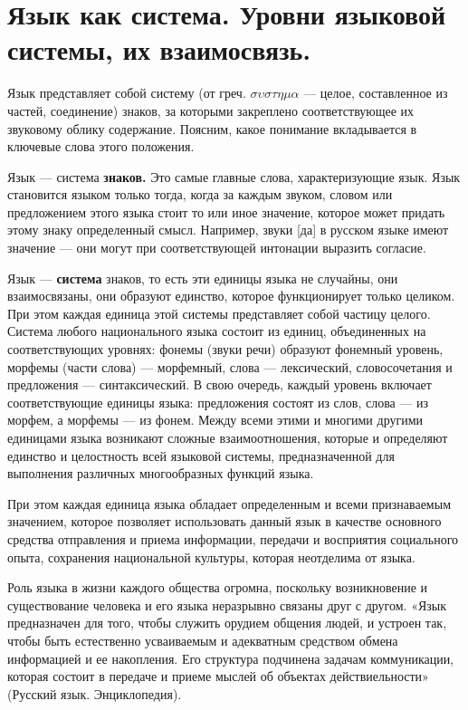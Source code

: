 \section{Язык как система. Уровни языковой системы, их взаимосвязь.}

Язык представляет собой систему (от греч. $\sigma \upsilon \sigma \tau \eta \mu \alpha$ --- целое, составленное из частей, соединение) знаков, за которыми закреплено соответствующее их звуковому облику содержание.
Поясним, какое понимание вкладывается в ключевые слова этого положения.

Язык --- система \textbf{знаков.}
Это самые главные слова, характеризующие язык.
Язык становится языком только тогда, когда за каждым звуком, словом или предложением этого языка стоит то или иное значение, которое может придать этому знаку определенный смысл.
Например, звуки [да] в русском языке имеют значение --- они могут при соответствующей интонации выразить согласие.

Язык --- \textbf{система} знаков, то есть эти единицы языка не случайны, они взаимосвязаны, они образуют единство, которое функционирует только целиком.
При этом каждая единица этой системы представляет собой частицу целого.
Система любого национального языка состоит из единиц, объединенных на соответствующих уровнях: фонемы (звуки речи) образуют фонемный уровень, морфемы (части слова) --- морфемный, слова --- лексический, словосочетания и предложения --- синтаксический.
В свою очередь, каждый уровень включает соответствующие единицы языка: предложения состоят из слов, слова --- из морфем, а морфемы --- из фонем.
Между всеми этими и многими другими единицами языка возникают сложные взаимоотношения, которые и определяют единство и целостность всей языковой системы, предназначенной для выполнения различных многообразных функций языка.

При этом каждая единица языка обладает определенным и всеми признаваемым значением, которое позволяет использовать данный язык в качестве основного средства отправления и приема информации, передачи и восприятия социального опыта, сохранения национальной культуры, которая неотделима от языка.

Роль языка в жизни каждого общества огромна, поскольку возникновение и существование человека и его языка неразрывно связаны друг с другом.
«Язык предназначен для того, чтобы служить орудием общения людей, и устроен так, чтобы быть естественно усваиваемым и адекватным средством обмена информацией и ее накопления.
Его структура подчинена задачам коммуникации, которая состоит в передаче и приеме мыслей об объектах действиельности» (Русский язык. Энциклопедия).

